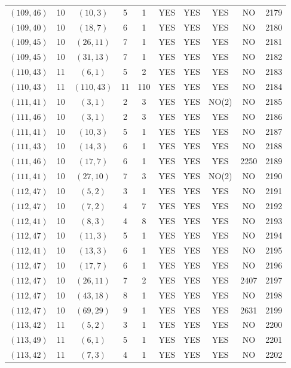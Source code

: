 \begin{longtable}{|c|c|c|c|c|c|c|c|c|c|}
$(109, 46)$ & 10 & $(10, 3)$ & 5 & 1 & YES & YES & YES & NO & 2179\\
$(109, 40)$ & 10 & $(18, 7)$ & 6 & 1 & YES & YES & YES & NO & 2180\\
$(109, 45)$ & 10 & $(26, 11)$ & 7 & 1 & YES & YES & YES & NO & 2181\\
$(109, 45)$ & 10 & $(31, 13)$ & 7 & 1 & YES & YES & YES & NO & 2182\\
$(110, 43)$ & 11 & $(6, 1)$ & 5 & 2 & YES & YES & YES & NO & 2183\\
$(110, 43)$ & 11 & $(110, 43)$ & 11 & 110 & YES & YES & YES & NO & 2184\\
$(111, 41)$ & 10 & $(3, 1)$ & 2 & 3 & YES & YES & NO(2) & NO & 2185\\
$(111, 46)$ & 10 & $(3, 1)$ & 2 & 3 & YES & YES & YES & NO & 2186\\
$(111, 41)$ & 10 & $(10, 3)$ & 5 & 1 & YES & YES & YES & NO & 2187\\
$(111, 43)$ & 10 & $(14, 3)$ & 6 & 1 & YES & YES & YES & NO & 2188\\
$(111, 46)$ & 10 & $(17, 7)$ & 6 & 1 & YES & YES & YES & 2250 & 2189\\
$(111, 41)$ & 10 & $(27, 10)$ & 7 & 3 & YES & YES & NO(2) & NO & 2190\\
$(112, 47)$ & 10 & $(5, 2)$ & 3 & 1 & YES & YES & YES & NO & 2191\\
$(112, 47)$ & 10 & $(7, 2)$ & 4 & 7 & YES & YES & YES & NO & 2192\\
$(112, 41)$ & 10 & $(8, 3)$ & 4 & 8 & YES & YES & YES & NO & 2193\\
$(112, 47)$ & 10 & $(11, 3)$ & 5 & 1 & YES & YES & YES & NO & 2194\\
$(112, 41)$ & 10 & $(13, 3)$ & 6 & 1 & YES & YES & YES & NO & 2195\\
$(112, 47)$ & 10 & $(17, 7)$ & 6 & 1 & YES & YES & YES & NO & 2196\\
$(112, 47)$ & 10 & $(26, 11)$ & 7 & 2 & YES & YES & YES & 2407 & 2197\\
$(112, 47)$ & 10 & $(43, 18)$ & 8 & 1 & YES & YES & YES & NO & 2198\\
$(112, 47)$ & 10 & $(69, 29)$ & 9 & 1 & YES & YES & YES & 2631 & 2199\\
$(113, 42)$ & 11 & $(5, 2)$ & 3 & 1 & YES & YES & YES & NO & 2200\\
$(113, 49)$ & 11 & $(6, 1)$ & 5 & 1 & YES & YES & YES & NO & 2201\\
$(113, 42)$ & 11 & $(7, 3)$ & 4 & 1 & YES & YES & YES & NO & 2202\\

\end{longtable}
